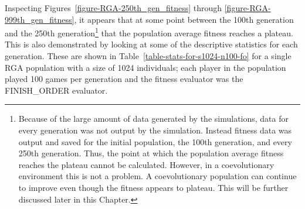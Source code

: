 Inspecting Figures~\ref{figure-RGA-250th_gen_fitness} through
\ref{figure-RGA-999th_gen_fitness}, it appears that at some point between the
100th generation and the 250th generation\footnote{Because of the large amount
of data generated by the simulations, data for every generation was not output
by the simulation. Instead fitness data was output and saved for the initial
population, the 100th generation, and every 250th generation. Thus, the point at
which the population average fitness reaches the plateau cannot be calculated.
However, in a coevolutionary environment this is not a problem. A coevolutionary
population can continue to improve even though the fitness appears to plateau.
This will be further discussed later in this Chapter.} that the population
average fitness reaches a plateau. This is also demonstrated by looking at some
of the descriptive statistics for each generation. These are shown in
Table~\ref{table-stats-for-s1024-n100-fo} for a single RGA population with a
size of 1024 individuals; each player in the population played 100 games per
generation and the fitness evaluator was the FINISH\_ORDER evaluator.

